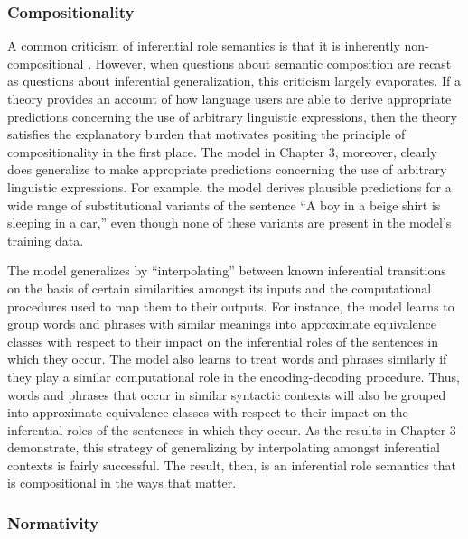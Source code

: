 \subsubsection{Compositionality}

A common criticism of inferential role semantics is that it is inherently non-compositional \citep{FodorLepore:1991}. However, when questions about semantic composition are recast as questions about inferential generalization, this criticism largely evaporates. If a theory provides an account of how language users are able to derive appropriate predictions concerning the use of arbitrary linguistic expressions, then the theory satisfies the explanatory burden that motivates positing the principle of compositionality in the first place. The model in Chapter 3, moreover, clearly does generalize to make appropriate predictions concerning the use of arbitrary linguistic expressions. For example, the model derives plausible predictions for a wide range of substitutional variants of the sentence ``A boy in a beige shirt is sleeping in a car,'' even though none of these variants are present in the model's training data. 

The model generalizes by ``interpolating'' between known inferential transitions on the basis of certain similarities amongst its inputs and the computational procedures used to map them to their outputs. For instance, the model learns to group words and phrases with similar meanings into approximate equivalence classes with respect to their impact on the inferential roles of the sentences in which they occur. The model also learns to treat words and phrases similarly if they play a similar computational role in the encoding-decoding procedure. Thus, words and phrases that occur in similar syntactic contexts will also be grouped into approximate equivalence classes with respect to their impact on the inferential roles of the sentences in which they occur. As the results in Chapter 3 demonstrate, this strategy of generalizing by interpolating amongst inferential contexts is fairly successful. The result, then, is an inferential role semantics that is compositional in the ways that matter. 

\subsubsection{Normativity}

